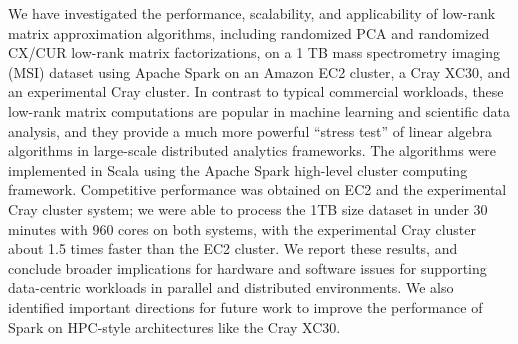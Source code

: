 We have investigated the performance, scalability, and applicability of low-rank matrix approximation algorithms, including randomized PCA and randomized CX/CUR low-rank matrix factorizations, on a 1 TB mass spectrometry imaging (MSI) dataset using Apache Spark on an Amazon EC2 cluster, a Cray XC30, and an experimental Cray cluster.  
In contrast to typical commercial workloads, these low-rank matrix computations are popular in machine learning and scientific data analysis, and they provide a much more powerful ``stress test'' of linear algebra algorithms in large-scale distributed analytics frameworks.  
The algorithms were implemented in Scala using the Apache Spark high-level cluster computing framework.  
Competitive performance was obtained on EC2 and the experimental Cray cluster system; we were able to process the 1TB size dataset in under 30 minutes with 960 cores on both systems, with the experimental Cray cluster about 1.5 times faster than the EC2 cluster.  
We report these results, and conclude broader implications for hardware and software issues for supporting data-centric workloads in parallel and distributed environments.  
We also identified important directions for future work to improve the performance of Spark on HPC-style architectures like the Cray XC30.
